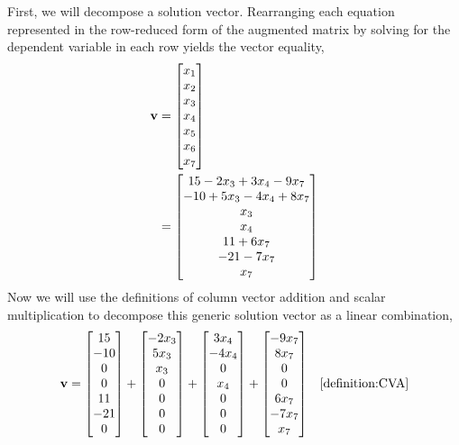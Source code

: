 \documentclass{ximera}
\begin{document}
\begin{example}
  First, we will decompose a solution vector.  Rearranging each
  equation represented in the row-reduced form of the augmented matrix
  by solving for the dependent variable in each row yields the vector
  equality,
  \begin{align*}
    \mathbf{v}
    &= \begin{bmatrix}x_1\\x_2\\x_3\\x_4\\x_5\\x_6\\x_7\end{bmatrix} \\
    &=\begin{bmatrix}
      15-2x_3+3x_4-9x_7\\
    -10+5x_3-4x_4+8x_7\\
    x_3\\
    x_4\\
    11+6x_7\\
    -21-7x_7\\
    x_7
    \end{bmatrix}
  \end{align*}
  Now we will use the definitions of column vector addition and scalar multiplication to decompose this generic solution vector as a linear combination,
  \begin{align*}
    \vect{v}
                                                 &=
                                                   \colvector{15\\ -10\\ 0\\ 0\\ 11\\ -21\\ 0 }
    +
    \colvector{ -2x_3\\ 5x_3\\ x_3\\ 0\\ 0\\ 0\\ 0 }
    +
    \colvector{ 3x_4\\ -4x_4\\ 0\\ x_4\\ 0\\ 0\\ 0 }
    +
    \colvector{ -9x_7\\ 8x_7\\ 0\\ 0\\ 6x_7\\ -7x_7\\ x_7 }
                                                 &&\ref{definition:CVA}\\

\end{align*}
\end{example}
\end{document}

